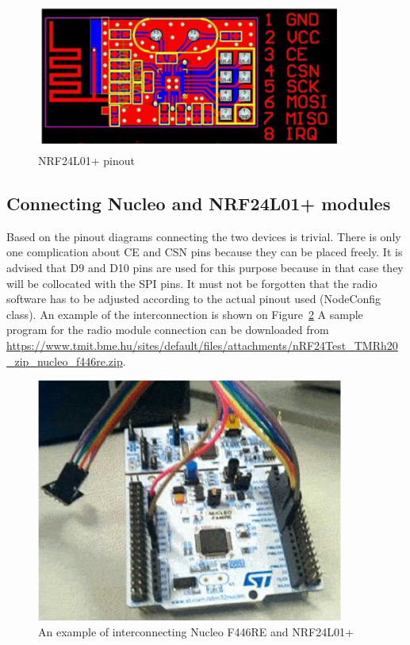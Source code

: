 \documentclass[a4paper]{article}
\begin{document}
\begin{figure}[H]
    \centering
    \includegraphics[width=0.9\textwidth]{figures/radio-pinout.png}
    \caption{NRF24L01+ pinout}
    \label{fig:radio-pinout}
\end{figure}

\subsection{Connecting Nucleo and NRF24L01+ modules}

Based on the pinout diagrams connecting the two devices is trivial. There is only one complication about CE and CSN
pins because they can be placed freely. It is advised that D9 and D10 pins are used for this purpose because in that
case they will be collocated with the SPI pins. It must not be forgotten that the radio software has to be adjusted
according to the actual pinout used (NodeConfig class). An example of the interconnection is shown on
Figure~\ref{fig:radio-nucleo-connection}
A sample program for the radio module connection can be downloaded from
\url{https://www.tmit.bme.hu/sites/default/files/attachments/nRF24Test_TMRh20_zip_nucleo_f446re.zip}.

\begin{figure}[H]
    \centering
    \includegraphics[width=0.9\textwidth]{figures/board-radio-example.png}
    \caption{An example of interconnecting Nucleo F446RE and NRF24L01+}
    \label{fig:radio-nucleo-connection}
\end{figure}
\end{document}
